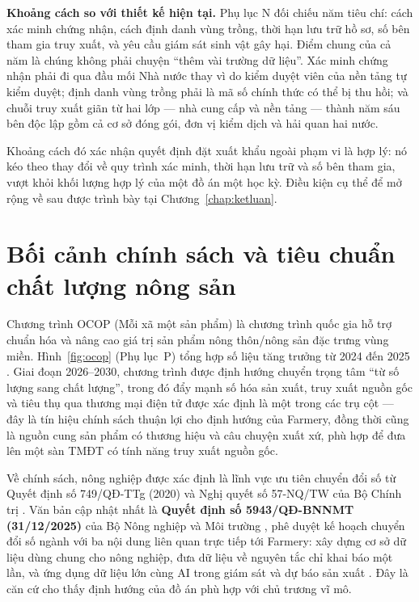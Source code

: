 \noindent\textbf{Khoảng cách so với thiết kế hiện tại.} Phụ lục N đối chiếu năm tiêu chí: cách xác minh chứng nhận, cách định danh vùng trồng, thời hạn lưu trữ hồ sơ, số bên tham gia truy xuất, và yêu cầu giám sát sinh vật gây hại. Điểm chung của cả năm là chúng không phải chuyện ``thêm vài trường dữ liệu''. Xác minh chứng nhận phải đi qua đầu mối Nhà nước thay vì do kiểm duyệt viên của nền tảng tự kiểm duyệt; định danh vùng trồng phải là mã số chính thức có thể bị thu hồi; và chuỗi truy xuất giãn từ hai lớp --- nhà cung cấp và nền tảng --- thành năm sáu bên độc lập gồm cả cơ sở đóng gói, đơn vị kiểm dịch và hải quan hai nước.

Khoảng cách đó xác nhận quyết định đặt xuất khẩu ngoài phạm vi là hợp lý: nó kéo theo thay đổi về quy trình xác minh, thời hạn lưu trữ và số bên tham gia, vượt khỏi khối lượng hợp lý của một đồ án một học kỳ. Điều kiện cụ thể để mở rộng về sau được trình bày tại Chương~\ref{chap:ketluan}.

\section{Bối cảnh chính sách và tiêu chuẩn chất lượng nông sản}
\label{sec:boicanhchinhsach}

Chương trình OCOP (Mỗi xã một sản phẩm) là chương trình quốc gia hỗ trợ chuẩn hóa và nâng cao giá trị sản phẩm nông thôn/nông sản đặc trưng vùng miền. Hình~\ref{fig:ocop} (Phụ lục~P) tổng hợp số liệu tăng trưởng từ 2024 đến 2025 \parencite{danviet_2024_ocop, vietnamnet_2025_ocop}. Giai đoạn 2026--2030, chương trình được định hướng chuyển trọng tâm ``từ số lượng sang chất lượng'', trong đó đẩy mạnh số hóa sản xuất, truy xuất nguồn gốc và tiêu thụ qua thương mại điện tử được xác định là một trong các trụ cột \parencite{vietnamnet_2025_ocop} --- đây là tín hiệu chính sách thuận lợi cho định hướng của Farmery, đồng thời cũng là nguồn cung sản phẩm có thương hiệu và câu chuyện xuất xứ, phù hợp để đưa lên một sàn TMĐT có tính năng truy xuất nguồn gốc.


Về chính sách, nông nghiệp được xác định là lĩnh vực ưu tiên chuyển đổi số từ Quyết định số 749/QĐ-TTg (2020) \parencite{qd749_2020} và Nghị quyết số 57-NQ/TW của Bộ Chính trị \parencite{nq57_tw}. Văn bản cập nhật nhất là \textbf{Quyết định số 5943/QĐ-BNNMT (31/12/2025)} của Bộ Nông nghiệp và Môi trường \parencite{botnmt_2025}, phê duyệt kế hoạch chuyển đổi số ngành với ba nội dung liên quan trực tiếp tới Farmery: xây dựng cơ sở dữ liệu dùng chung cho nông nghiệp, đưa dữ liệu về nguyên tắc chỉ khai báo một lần, và ứng dụng dữ liệu lớn cùng AI trong giám sát và dự báo sản xuất \parencite{qd5943_2025}. Đây là căn cứ cho thấy định hướng của đồ án phù hợp với chủ trương vĩ mô.

